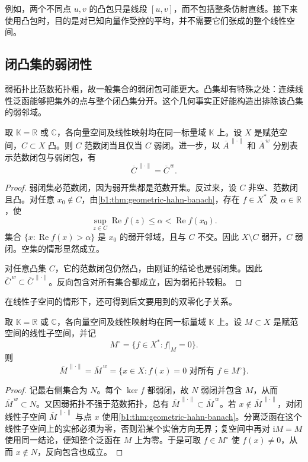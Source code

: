 \ProseParagraphBreak

例如，两个不同点 \(u,v\) 的凸包只是线段 \([u,v]\)，而不包括整条仿射直线。接下来使用凸包时，目的是对已知向量作受控的平均，并不需要它们张成的整个线性空间。

\subsection{闭凸集的弱闭性}
\label{b1:subsec:090502}

弱拓扑比范数拓扑粗，故一般集合的弱闭包可能更大。凸集却有特殊之处：连续线性泛函能够把集外的点与整个闭凸集分开。这个几何事实正好能构造出排除该凸集的弱邻域。

\begin{theorem}[凸集的两种闭包]
\label{b1:thm:convex-weak-closure}
取 \(\mathbb K=\mathbb R\) 或 \(\mathbb C\)，各向量空间及线性映射均在同一标量域 \(\mathbb K\) 上。设 \(X\) 是赋范空间，\(C\subset X\) 凸。则 \(C\) 范数闭当且仅当 \(C\) 弱闭。进一步，以 \(\overline A^{\,\|\cdot\|}\) 和 \(\overline A^{\,w}\) 分别表示范数闭包与弱闭包，有
\[
  \overline C^{\,\|\cdot\|}=\overline C^{\,w}.
\]
\end{theorem}

\begin{proof}
弱闭集必范数闭，因为弱开集都是范数开集。反过来，设 \(C\) 非空、范数闭且凸。对任意 \(x_0\notin C\)，由\cref{b1:thm:geometric-hahn-banach}，存在 \(f\in X^*\) 及 \(\alpha\in\mathbb R\)，使
\[
  \sup_{z\in C}\operatorname{Re}f(z)
  \leq\alpha<\operatorname{Re}f(x_0).
\]
集合 \(\{x:\operatorname{Re}f(x)>\alpha\}\) 是 \(x_0\) 的弱开邻域，且与 \(C\) 不交。因此 \(X\setminus C\) 弱开，\(C\) 弱闭。空集的情形显然成立。

对任意凸集 \(C\)，它的范数闭包仍然凸，由刚证的结论也是弱闭集。因此 \(\overline C^{\,w}\subset\overline C^{\,\|\cdot\|}\)。反向包含对所有集合都成立，因为弱拓扑较粗。
\end{proof}

在线性子空间的情形下，还可得到后文要用到的双零化子关系。

\begin{proposition}[线性子空间的双零化子]\label{b1:prop:double-annihilator}
取 \(\mathbb K=\mathbb R\) 或 \(\mathbb C\)，各向量空间及线性映射均在同一标量域 \(\mathbb K\) 上。设 \(M\subset X\) 是赋范空间的线性子空间，并记
\[
 M^\circ=\{f\in X^*:f|_M=0\}.
\]
则
\[
 \overline M^{\,\|\cdot\|}
 =\overline M^{\,w}
 =\{x\in X:f(x)=0\text{ 对所有 }f\in M^\circ\}.
\]
\end{proposition}
\begin{proof}
记最右侧集合为 \(N\)。每个 \(\ker f\) 都弱闭，故 \(N\) 弱闭并包含 \(M\)，从而 \(\overline M^{\,w}\subset N\)。又因弱拓扑不强于范数拓扑，总有 \(\overline M^{\,\|\cdot\|}\subset\overline M^{\,w}\)。若 \(x\notin\overline M^{\,\|\cdot\|}\)，对闭线性子空间 \(\overline M^{\,\|\cdot\|}\) 与点 \(x\) 使用\cref{b1:thm:geometric-hahn-banach}。分离泛函在这个线性子空间上的实部必须为零，否则沿某个实倍方向无界；复空间中再对 \(\mathrm iM=M\) 使用同一结论，便知整个泛函在 \(M\) 上为零。于是可取 \(f\in M^\circ\) 使 \(f(x)\ne0\)，从而 \(x\notin N\)，反向包含也成立。
\end{proof}

